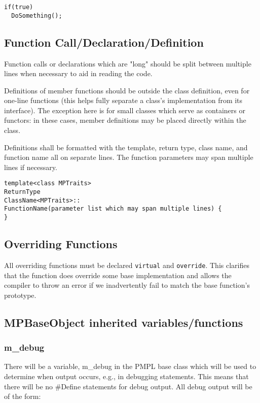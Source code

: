 \documentclass[12pt]{article}
\begin{document}
\begin{lstlisting}
if(true)
  DoSomething();
\end{lstlisting}

\subsection{Function Call/Declaration/Definition}
Function calls or declarations which are "long" should be split between multiple
lines when necessary to aid in reading the code.

Definitions of member functions should be outside the class definition, even for
one-line functions (this helps fully separate a class's implementation from its
interface). The exception here is for small classes which serve as containers or
functors: in these cases, member definitions may be placed directly within the
class.

Definitions shall be formatted with the template, return type, class name, and
function name all on separate lines. The function parameters may span multiple
lines if necessary.

\begin{lstlisting}
template<class MPTraits>
ReturnType
ClassName<MPTraits>::
FunctionName(parameter list which may span multiple lines) {
}
\end{lstlisting}

\subsection{Overriding Functions}

All overriding functions must be declared \texttt{virtual} and
\texttt{override}. This clarifies that the function does override some base
implementation and allows the compiler to throw an error if we inadvertently
fail to match the base function's prototype.

\subsection{MPBaseObject inherited variables/functions}

\subsubsection{m\_debug}

There will be a variable, m\_debug in the PMPL base class which will be used to
determine when output occurs, e.g., in debugging statements. This means that
there will be no \#Define statements for debug output. All debug output will be
of the form:
\end{document}
